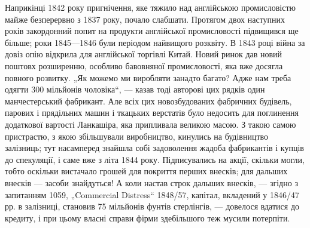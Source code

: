 Наприкінці 1842 року пригнічення, яке тяжило над англійською промисловістю майже безперервно з 1837
року, почало
слабшати. Протягом двох наступних років закордонний попит
на продукти англійської промисловості підвищився ще більше;
роки 1845—1846 були періодом найвищого розквіту. В 1843 році
війна за довіз опію відкрила для англійської торгівлі Китай. Новий
ринок дав новий поштовх розширенню, особливо бавовняної
промисловості, яка вже досягла повного розвитку. „Як можемо
ми виробляти занадто багато? Адже нам треба одягти 300 мільйонів чоловіка“, — казав тоді авторові
цих рядків один манчестерський фабрикант. Але всіх цих новозбудованих фабричних
будівель, парових і прядільних машин і ткацьких верстатів було
недосить для поглинення додаткової вартості Ланкашіра, яка
припливала великою масою. З такою самою пристрастю, з якою
збільшували виробництво, кинулись на будівництво залізниць;
тут насамперед знайшла собі задоволення жадоба фабрикантів і
купців до спекуляції, і саме вже з літа 1844 року. Підписувались на акції, скільки могли, тобто
оскільки вистачало грошей для покриття перших внесків; для дальших внесків — засоби знайдуться! А
коли настав строк дальших внесків, — згідно
з запитанням 1059, „Commercial Distress“ 1848/57, капітал, вкладений у 1846/47 рр. в залізниці,
становив 75 мільйонів фунтів
стерлінгів, — довелося вдатися до кредиту, і при цьому власні
справи фірми здебільшого теж мусили потерпіти.
